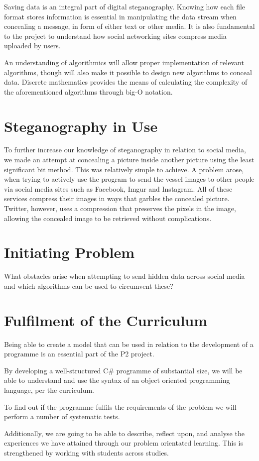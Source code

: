 \documentclass[a4paper,12pt,hidelinks]{article}
\begin{document}
Saving data is an integral part of digital steganography. Knowing how each file format stores information is essential in manipulating the data stream when concealing a message, in form of either text or other media. 
It is also fundamental to the project to understand how social networking sites compress media uploaded by users.

An understanding of algorithmics will allow proper implementation of relevant algorithms, though will also make it possible to design new algorithms to conceal data. Discrete mathematics provides the means of calculating the complexity of the aforementioned algorithms through big-O notation.

	\section*{Steganography in Use}
To further increase our knowledge of steganography in relation to social media, we made an attempt at concealing a picture inside another picture using the least significant bit method. This was relatively simple to achieve. A problem arose, when trying to actively use the program to send the vessel images to other people via social media sites such as Facebook, Imgur and Instagram. All of these services compress their images in ways that garbles the concealed picture. Twitter, however, uses a compression that preserves the pixels in the image, allowing the concealed image to be retrieved without complications.

	\section*{Initiating Problem}
What obstacles arise when attempting to send hidden data across social media and which algorithms can be used to circumvent these?

	\section*{Fulfilment of the Curriculum}
Being able to create a model that can be used in relation to the development of a programme is an essential part of the P2 project. 

By developing a well-structured C\# programme of substantial size, we will be able to understand and use the syntax of an object oriented programming language, per the curriculum.

To find out if the programme fulfils the requirements of the problem we will perform a number of systematic tests.

Additionally, we are going to be able to describe, reflect upon, and analyse the experiences we have attained through our problem orientated learning. This is strengthened by working with students across studies.

 
\end{document}
